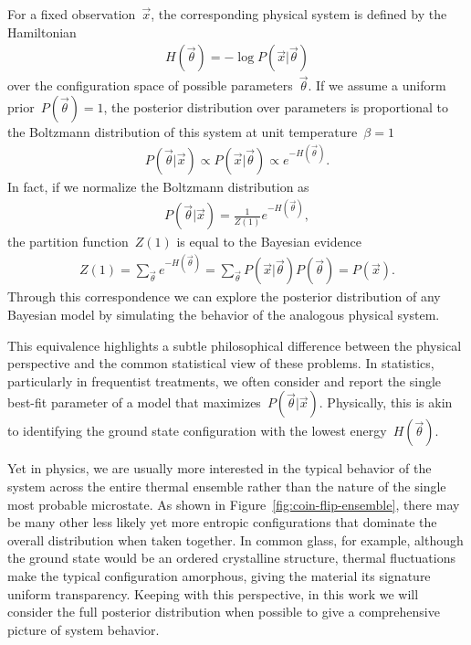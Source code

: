 For a fixed observation~$\vec{x}$, the corresponding physical system is defined by the Hamiltonian \begin{align}
    H(\vec{\theta}) = -\log P(\vec{x}|\vec{\theta}) \label{eq:energy-posterior-relation}
\end{align}
over the configuration space of possible parameters~$\vec{\theta}$. If we assume a uniform prior~$P(\vec{\theta}) = 1$, the posterior distribution over parameters is proportional to the Boltzmann distribution of this system at unit temperature~$\beta = 1$ \begin{align}
    P(\vec{\theta}|\vec{x}) \propto P(\vec{x}|\vec{\theta}) \propto e^{-H(\vec{\theta})}.
\end{align}
In fact, if we normalize the Boltzmann distribution as \begin{align}
    P(\vec{\theta}|\vec{x}) = \frac{1}{Z(1)} e^{-H(\vec{\theta})},
\end{align}
the partition function~$Z(1)$ is equal to the Bayesian evidence \begin{align}
    Z(1) = \sum_{\vec{\theta}} e^{-H(\vec{\theta})} = \sum_{\vec{\theta}} P(\vec{x}|\vec{\theta}) P(\vec{\theta}) = P(\vec{x}).
\end{align}
Through this correspondence we can explore the posterior distribution of any Bayesian model by simulating the behavior of the analogous physical system. 

This equivalence highlights a subtle philosophical difference between the physical perspective and the common statistical view of these problems. In statistics, particularly in frequentist treatments, we often consider and report the single best-fit parameter of a model that maximizes~$P(\vec{\theta}|\vec{x})$. Physically, this is akin to identifying the ground state configuration with the lowest energy~$H(\vec{\theta})$.

Yet in physics, we are usually more interested in the typical behavior of the system across the entire thermal ensemble rather than the nature of the single most probable microstate. As shown in Figure~\ref{fig:coin-flip-ensemble}, there may be many other less likely yet more entropic configurations that dominate the overall distribution when taken together. In common glass, for example, although the ground state would be an ordered crystalline structure, thermal fluctuations make the typical configuration amorphous, giving the material its signature uniform transparency. Keeping with this perspective, in this work we will consider the full posterior distribution when possible to give a comprehensive picture of system behavior.

